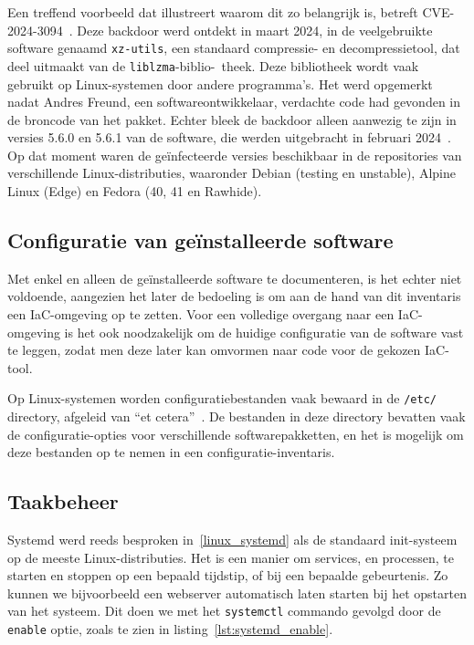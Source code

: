 Een treffend voorbeeld dat illustreert waarom dit zo belangrijk is, betreft CVE-2024-3094~\autocite{nist-CVE-2024-3094}.
Deze backdoor werd ontdekt in maart 2024, in de veelgebruikte software genaamd \texttt{xz-utils}, een standaard compressie- en decompressietool, dat deel uitmaakt van de \texttt{liblzma}-biblio-\ theek.
Deze bibliotheek wordt vaak gebruikt op Linux-systemen door andere programma's.
Het werd opgemerkt nadat Andres Freund, een softwareontwikkelaar, verdachte code had gevonden in de broncode van het pakket.
Echter bleek de backdoor alleen aanwezig te zijn in versies 5.6.0 en 5.6.1 van de software, die werden uitgebracht in februari 2024~\autocite{lins2024critical}.
Op dat moment waren de ge\"infecteerde versies beschikbaar in de repositories van verschillende Linux-distributies, waaronder Debian (testing en unstable), Alpine Linux (Edge) en Fedora (40, 41 en Rawhide).

\subsection{Configuratie van ge{\"i}nstalleerde software}
\label{risico_software_configuratie}

Met enkel en alleen de ge\"installeerde software te documenteren, is het echter niet voldoende, aangezien het later de bedoeling is om aan de hand van dit inventaris een IaC-omgeving op te zetten.
Voor een volledige overgang naar een IaC-omgeving is het ook noodzakelijk om de huidige configuratie van de software vast te leggen, zodat men deze later kan omvormen naar code voor de gekozen IaC-tool.

Op Linux-systemen worden configuratiebestanden vaak bewaard in de \texttt{/etc/} directory, afgeleid van ``et cetera''~\autocite{linuxfoundation-filesystem}.
De bestanden in deze directory bevatten vaak de configuratie-opties voor verschillende softwarepakketten, en het is mogelijk om deze bestanden op te nemen in een configuratie-inventaris.

\subsection{Taakbeheer}
\label{risico_taakbeheer}

Systemd werd reeds besproken in~\ref{linux_systemd} als de standaard init-systeem op de meeste Linux-distributies.
Het is een manier om services, en processen, te starten en stoppen op een bepaald tijdstip, of bij een bepaalde gebeurtenis.
Zo kunnen we bijvoorbeeld een webserver automatisch laten starten bij het opstarten van het systeem.
Dit doen we met het \texttt{systemctl} commando gevolgd door de \texttt{enable} optie, zoals te zien in listing~\ref{lst:systemd_enable}.

